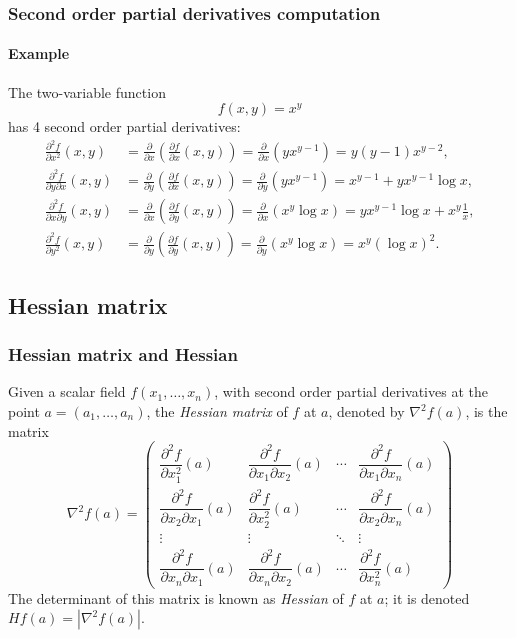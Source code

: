 \begin{frame}
\frametitle{Second order partial derivatives computation}
\framesubtitle{Example}
The two-variable function
\[f(x,y)=x^y\]
has 4 second order partial derivatives:
\begin{align*}
\frac{\partial^2 f}{\partial x^2}(x,y) &=
\frac{\partial}{\partial x}\left(\frac{\partial f}{\partial x}(x,y)\right) =
\frac{\partial}{\partial x}\left(yx^{y-1}\right) =
y(y-1)x^{y-2},\\
\frac{\partial^2 f}{\partial y \partial x}(x,y) &=
\frac{\partial}{\partial y}\left(\frac{\partial f}{\partial x}(x,y)\right) =
\frac{\partial}{\partial y}\left(yx^{y-1}\right) =
x^{y-1}+yx^{y-1}\log x,\\
\frac{\partial^2 f}{\partial x \partial y}(x,y) &=
\frac{\partial}{\partial x}\left(\frac{\partial f}{\partial y}(x,y)\right) =
\frac{\partial}{\partial x}\left(x^y\log x \right) =
yx^{y-1}\log x+x^y\frac{1}{x},\\
\frac{\partial^2 f}{\partial y^2}(x,y) &=
\frac{\partial}{\partial y}\left(\frac{\partial f}{\partial y}(x,y)\right) =
\frac{\partial}{\partial y}\left(x^y\log x \right) =
x^y(\log x)^2.
\end{align*}
\end{frame}



\subsection{Hessian matrix}
\begin{frame}
\frametitle{Hessian matrix and Hessian}
\begin{definition}
Given a scalar field $f(x_1,\ldots,x_n)$, with second order partial derivatives at the point $a=(a_1,\ldots,a_n)$, the \emph{Hessian matrix} of $f$ at $a$, denoted by $\nabla^2f(a)$, is the matrix
\[
\nabla^2f(a)=\left(
\begin{array}{cccc}
\dfrac{\partial^2 f}{\partial x_1^2}(a) &
\dfrac{\partial^2 f}{\partial x_1 \partial x_2}(a) &
\cdots &
\dfrac{\partial^2 f}{\partial x_1 \partial x_n}(a)\\
\dfrac{\partial^2 f}{\partial x_2 \partial x_1}(a) &
\dfrac{\partial^2 f}{\partial x_2^2}(a) &
\cdots &
\dfrac{\partial^2 f}{\partial x_2 \partial x_n}(a)\\
\vdots & \vdots & \ddots & \vdots \\
\dfrac{\partial^2 f}{\partial x_n \partial x_1}(a) &
\dfrac{\partial^2 f}{\partial x_n \partial x_2}(a) &
\cdots &
\dfrac{\partial^2 f}{\partial x_n^2}(a)
\end{array}
\right)
\]
The determinant of this matrix is known as \emph{Hessian} of $f$ at $a$; it is denoted $Hf(a)=|\nabla^2f(a)|$.
\end{definition}
\end{frame}


